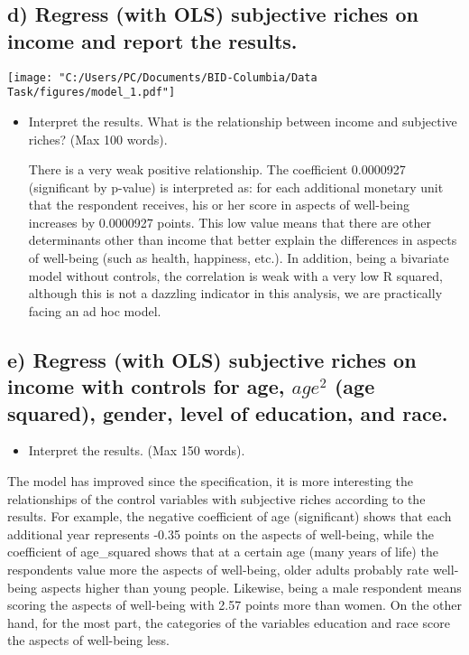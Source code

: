 \documentclass[12pt,a4paper]{article}
\begin{document}
	\subsection*{\normalsize{d) Regress (with OLS) subjective riches on income and report the results.}}
	
	\begin{center}
		\texttt{[image: "C:/Users/PC/Documents/BID-Columbia/Data Task/figures/model\_1.pdf"]}
	\end{center}
	
	
	
	\begin{itemize}
		\item Interpret the results. What is the relationship between income and subjective riches? (Max
		100 words).
		
		There is a very weak positive relationship. The coefficient 0.0000927 (significant by p-value) is interpreted as: for each additional monetary unit that the respondent receives, his or her score in aspects of well-being increases by 0.0000927 points. This low value means that there are other determinants other than income that better explain the differences in aspects of well-being (such as health, happiness, etc.). In addition, being a bivariate model without controls, the correlation is weak with a very low R squared, although this is not a dazzling indicator in this analysis, we are practically facing an ad hoc model.
		
	\end{itemize}
	\subsection*{\normalsize{e) Regress (with OLS) subjective riches on income with controls for age, $age^{2}$ (age squared), gender, level of education, and race.}}
	
	
	
	\begin{itemize}
		\item Interpret the results. (Max 150 words).
	\end{itemize}

The model has improved since the specification, it is more interesting the relationships of the control variables with subjective riches according to the results. For example, the negative coefficient of age (significant) shows that each additional year represents -0.35 points on the aspects of well-being, while the coefficient of age\_squared shows that at a certain age (many years of life) the respondents value more the aspects of well-being, older adults probably rate well-being aspects higher than young people. Likewise, being a male respondent means scoring the aspects of well-being with 2.57 points more than women. On the other hand, for the most part, the categories of the variables education and race score the aspects of well-being less.
\end{document}
